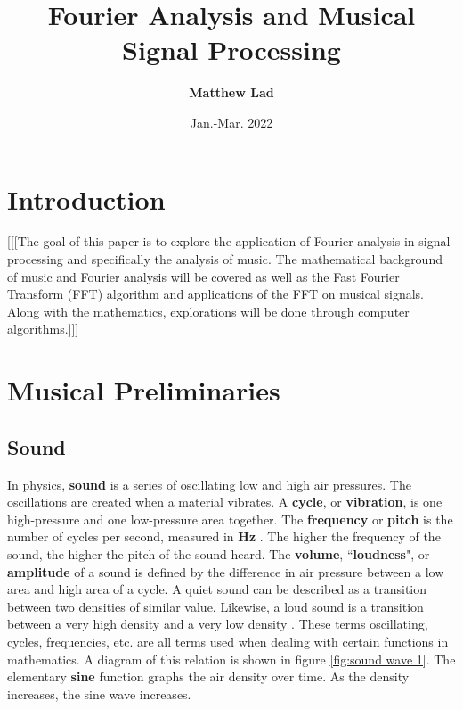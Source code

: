\documentclass[10pt]{article}
\title{
    \textbf{Fourier Analysis and Musical Signal Processing}}
\author{\textbf{Matthew Lad}}
\date{Jan.-Mar. 2022}
\begin{document}
 
\maketitle

\section{Introduction}
\hspace{\parindent} [[[The goal of this paper is to explore the application of Fourier analysis in signal processing and specifically the analysis of music. The mathematical background of music and Fourier analysis will be covered as well as the Fast Fourier Transform (FFT) algorithm and applications of the FFT on musical signals. Along with the mathematics, explorations will be done through computer algorithms.]]]

\section{Musical Preliminaries}
\subsection{Sound}
\hspace{\parindent} In physics, \textbf{sound} is a series of oscillating low and high air pressures. The oscillations are created when a material vibrates. A \textbf{cycle}, or \textbf{vibration}, is one high-pressure and one low-pressure area together. The \textbf{frequency} or \textbf{pitch} is the number of cycles per second, measured in \textbf{Hz} \cite{hertzDefinition}. The higher the frequency of the sound, the higher the pitch of the sound heard. The \textbf{volume}, \textquotedblleft\textbf{loudness}", or \textbf{amplitude} of a sound is defined by the difference in air pressure between a low area and high area of a cycle. A quiet sound can be described as a transition between two densities of similar value. Likewise, a loud sound is a transition between a very high density and a very low density \cite{boatwright1956musictheory} \cite{lenssen2014fouriermusic}. These terms oscillating, cycles, frequencies, etc. are all terms used when dealing with certain functions in mathematics. A diagram of this relation is shown in figure \ref{fig:sound wave 1}. The elementary \textbf{sine} function graphs the air density over time. As the density increases, the sine wave increases.
\end{document}
